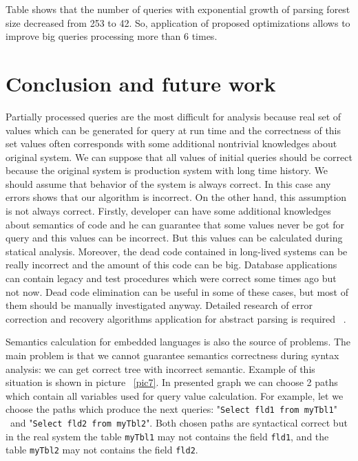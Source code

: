 \documentclass{llncs}
\begin{document}
Table shows that the number of queries with exponential growth of parsing forest size decreased from 253 to 42. So, application of proposed optimizations allows to improve big queries processing more than 6 times.

\section{Conclusion and future work}
\label{sec:Conclusion}

Partially processed queries are the most difficult for analysis because real set of values which can be generated for query at run time and the correctness of this set values often corresponds with some additional nontrivial knowledges about original system. We can suppose that all values of initial queries should be correct because the original system is production system with long time history. We should assume that behavior of the system is always correct. In this case any errors shows that our algorithm is incorrect. On the other hand, this assumption is not always correct. Firstly, developer can have some additional knowledges about semantics of code and he can guarantee that some values never be got for query and this values can be incorrect. But this values can be calculated during statical analysis. Moreover, the dead code contained in long-lived systems can be really incorrect and the amount of this code can be big. Database applications can contain legacy and test procedures which were correct some times ago but not now. Dead code elimination can be useful in some of these cases, but most of them should be manually investigated anyway. Detailed research of error correction and recovery algorithms application for abstract parsing is required ~\cite{RelaxedLALR}.

 
Semantics calculation for embedded languages is also the source of problems. The main problem is that we cannot guarantee semantics correctness during syntax analysis: we can get correct tree with incorrect semantic. Example of this situation is shown in picture ~\ref{pic7}. In presented graph we can choose 2 paths which contain all variables used for query value calculation. For example, let we choose the paths which produce the next queries: "\verb|Select fld1 from myTbl1|" \ and "\verb|Select fld2 from myTbl2|". Both chosen paths are syntactical correct but in the real system the table \verb|myTbl1| may not contains the field \verb|fld1|, and the table  \verb|myTbl2| may not contains the field \verb|fld2|.  
\end{document}
